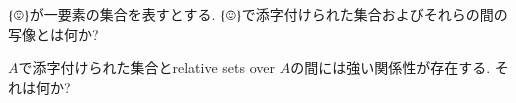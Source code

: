 \begin{exercise}
$\singleton$が一要素の集合を表すとする. $\singleton$で添字付けられた集合およびそれらの間の写像とは何か?
\end{exercise}

\begin{exercise}
$A$で添字付けられた集合とrelative sets over $A$の間には強い関係性が存在する. それは何か?
\end{exercise}



